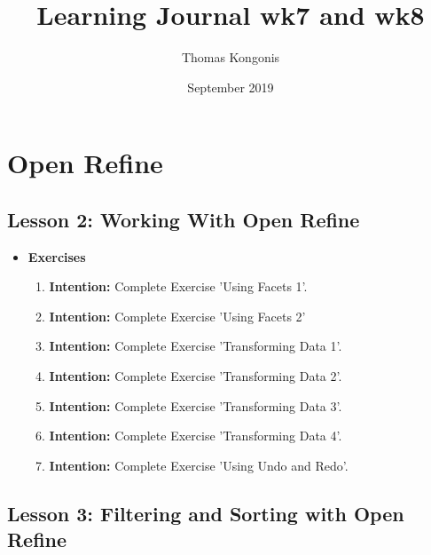 \documentclass{article}
\title{Learning Journal wk7 and wk8}
\author{Thomas Kongonis}
\date{September 2019}
\begin{document}
\maketitle

\tableofcontents

\section{Open Refine}

\subsection{Lesson 2: Working With Open Refine}

\begin{itemize}
\item{\textbf{Exercises}}

\begin{enumerate}

\item{\textbf{Intention:} Complete Exercise 'Using Facets 1'.}

\item{\textbf{Intention:} Complete Exercise 'Using Facets 2'}

\item{\textbf{Intention:} Complete Exercise 'Transforming Data 1'.}

\item{\textbf{Intention:} Complete Exercise 'Transforming Data 2'.}

\item{\textbf{Intention:} Complete Exercise 'Transforming Data 3'.}

\item{\textbf{Intention:} Complete Exercise 'Transforming Data 4'.}

\item{\textbf{Intention:} Complete Exercise 'Using Undo and Redo'.}

\end{enumerate}
\end{itemize}



\subsection{Lesson 3: Filtering and Sorting with Open Refine}
\end{document}
